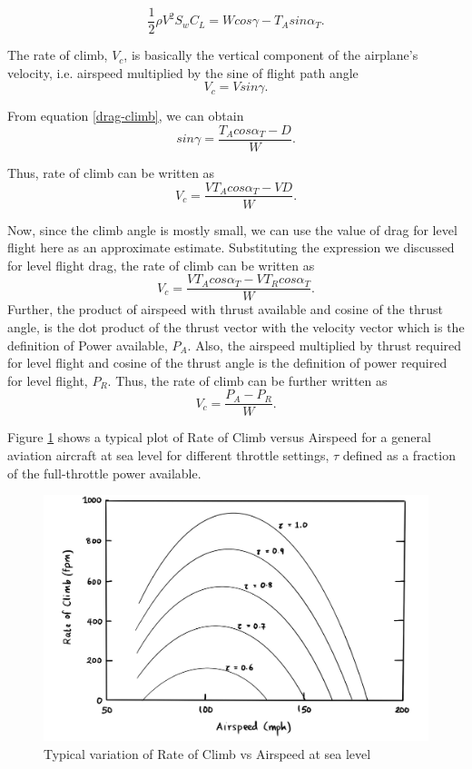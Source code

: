 \documentclass[letterpaper,12pt]{article}
\begin{document}
\begin{equation}
\frac{1}{2}\rho V^2S_wC_L=Wcos\gamma-T_Asin\alpha_T.
\end{equation}

The rate of climb, $V_c$, is basically the vertical component of the airplane's velocity, i.e. airspeed multiplied by the sine of flight path angle
\[
V_c=Vsin\gamma.
\]

From equation \ref{drag-climb}, we can obtain
\begin{equation}
sin\gamma=\frac{T_Acos\alpha_T-D}{W}.
\end{equation}

Thus, rate of climb can be written as
\begin{equation}
V_c=\frac{VT_Acos\alpha_T-VD}{W}.
\end{equation}

Now, since the climb angle is mostly small, we can use the value of drag for level flight here as an approximate estimate. Substituting the expression we discussed for level flight drag, the rate of climb can be written as
\begin{equation}
V_c=\frac{VT_Acos\alpha_T-VT_Rcos\alpha_T}{W}.
\end{equation}
Further, the product of airspeed with thrust available and cosine of the thrust angle, is the dot product of the thrust vector with the velocity vector which is the definition of Power available, $P_A$. Also, the airspeed multiplied by thrust required for level flight and cosine of the thrust angle is the definition of power required for level flight, $P_R$. Thus, the rate of climb can be further written as
\begin{equation}
\boxed{
V_c=\frac{P_A-P_R}{W}.
}
\label{roc-final}
\end{equation}

Figure \ref{ROC} shows a typical plot of Rate of Climb versus Airspeed for a general aviation aircraft at sea level for different throttle settings, $\tau$ defined as a fraction of the full-throttle power available.
\begin{figure}
\includegraphics[scale=0.3]{plot_ROC}
\centering
\caption{Typical variation of Rate of Climb vs Airspeed at sea level}
\label{ROC}
\end{figure}
\end{document}
